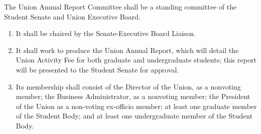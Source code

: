 \item The Union Annual Report Committee shall be a standing committee of the Student Senate and Union Executive Board.
\begin{enumerate}
\item It shall be chaired by the Senate-Executive Board Liaison.
\item It shall work to produce the Union Annual Report, which will detail the Union Activity Fee for both graduate and
undergraduate students; this report will be presented to the Student Senate for approval.
\item Its membership shall consist of the Director of the Union, as a nonvoting member; the Business Administrator, as a
nonvoting member; the President of the Union as a non-voting ex-officio member; at least one graduate member of the
Student Body; and at least one undergraduate member of the Student Body.
\end{enumerate}
